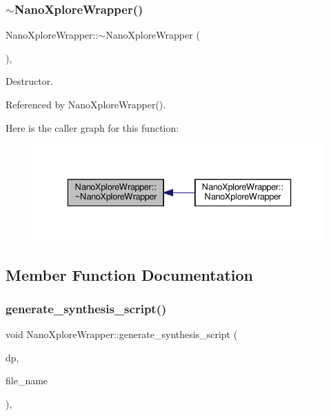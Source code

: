 \subsubsection{\texorpdfstring{$\sim$\+Nano\+Xplore\+Wrapper()}{~NanoXploreWrapper()}}
{\footnotesize\ttfamily Nano\+Xplore\+Wrapper\+::$\sim$\+Nano\+Xplore\+Wrapper (\begin{DoxyParamCaption}{ }\end{DoxyParamCaption})\hspace{0.3cm}{\ttfamily [override]}, {\ttfamily [default]}}



Destructor. 



Referenced by Nano\+Xplore\+Wrapper().

Here is the caller graph for this function\+:
\nopagebreak
\begin{figure}[H]
\begin{center}
\leavevmode
\includegraphics[width=336pt]{da/d28/classNanoXploreWrapper_a77516222ea5ee579e188457e26886a4e_icgraph}
\end{center}
\end{figure}


\subsection{Member Function Documentation}
\mbox{\label{classNanoXploreWrapper_ac4cfa67a4c97e96b14aca7dbbe39e79b}} 
\subsubsection{\texorpdfstring{generate\+\_\+synthesis\+\_\+script()}{generate\_synthesis\_script()}}
{\footnotesize\ttfamily void Nano\+Xplore\+Wrapper\+::generate\+\_\+synthesis\+\_\+script (\begin{DoxyParamCaption}\item[{const \hyperlink{DesignParameters_8hpp_ae36bb1c4c9150d0eeecfe1f96f42d157}{Design\+Parameters\+Ref} \&}]{dp,  }\item[{const std\+::string \&}]{file\+\_\+name }\end{DoxyParamCaption})\hspace{0.3cm}{\ttfamily [override]}, {\ttfamily [virtual]}}



